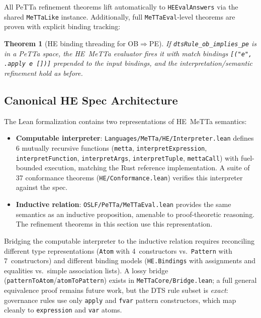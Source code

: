 \documentclass[]{article}
\newtheorem{theorem}{Theorem}
\newcommand{\code}[1]{\texttt{#1}}
\begin{document}
\noindent
All PeTTa refinement theorems lift automatically to \code{HEEvalAnswers}
via the shared \code{MeTTaLike} instance.  Additionally, full
\code{MeTTaEval}-level theorems are proven with explicit binding tracking:

\begin{theorem}[HE binding threading for OB$\Rightarrow$PE]
If \code{dtsRule\_ob\_implies\_pe} is in a PeTTa space, the HE~MeTTa evaluator
fires it with match bindings \code{[("e", .apply e [])]} prepended to the
input bindings, and the interpretation/semantic refinement hold as before.
\end{theorem}

\subsection{Canonical HE Spec Architecture}

The Lean formalization contains two representations of HE~MeTTa semantics:

\begin{itemize}
\item \textbf{Computable interpreter}: \code{Languages/MeTTa/HE/Interpreter.lean}
      defines 6 mutually recursive functions (\code{metta},
      \code{interpretExpression}, \code{interpretFunction},
      \code{interpretArgs}, \code{interpretTuple}, \code{mettaCall})
      with fuel-bounded execution, matching the Rust reference implementation.
      A suite of 37 conformance theorems
      (\code{HE/Conformance.lean}) verifies this interpreter against the spec.
\item \textbf{Inductive relation}: \code{OSLF/PeTTa/MeTTaEval.lean} provides
      the same semantics as an inductive proposition, amenable to
      proof-theoretic reasoning.  The refinement theorems in this section
      use this representation.
\end{itemize}

\noindent
Bridging the computable interpreter to the inductive relation requires
reconciling different type representations (\code{Atom} with 4~constructors
vs.\ \code{Pattern} with 7~constructors) and different binding models
(\code{HE.Bindings} with assignments and equalities vs.\ simple association
lists).  A lossy bridge (\code{patternToAtom}/\code{atomToPattern}) exists
in \code{MeTTaCore/Bridge.lean}; a full general equivalence proof remains
future work, but the DTS rule subset is \emph{exact}: governance rules
use only \code{apply} and \code{fvar} pattern constructors, which map
cleanly to \code{expression} and \code{var} atoms.
\end{document}
